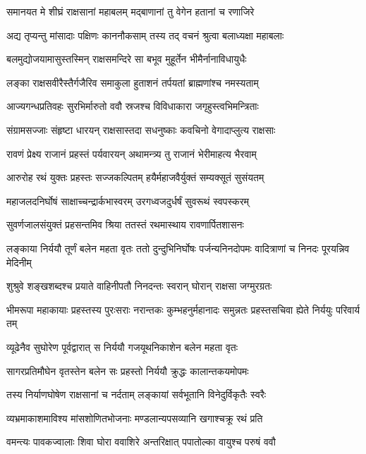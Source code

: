 \twolineshloka
{समानयत मे शीघ्रं राक्षसानां महाबलम्}
{मद्बाणानां तु वेगेन हतानां च रणाजिरे} %

\twolineshloka
{अद्य तृप्यन्तु मांसादाः पक्षिणः काननौकसाम्}
{तस्य तद् वचनं श्रुत्वा बलाध्यक्षा महाबलाः} %

\twolineshloka
{बलमुद्योजयामासुस्तस्मिन् राक्षसमन्दिरे}
{सा बभूव मुहूर्तेन भीमैर्नानाविधायुधैः} %

\twolineshloka
{लङ्का राक्षसवीरैस्तैर्गजैरिव समाकुला}
{हुताशनं तर्पयतां ब्राह्मणांश्च नमस्यताम्} %

\twolineshloka
{आज्यगन्धप्रतिवहः सुरभिर्मारुतो ववौ}
{स्रजश्च विविधाकारा जगृहुस्त्वभिमन्त्रिताः} %

\twolineshloka
{संग्रामसज्जाः संहृष्टा धारयन् राक्षसास्तदा}
{सधनुष्काः कवचिनो वेगादाप्लुत्य राक्षसाः} %

\twolineshloka
{रावणं प्रेक्ष्य राजानं प्रहस्तं पर्यवारयन्}
{अथामन्त्र्य तु राजानं भेरीमाहत्य भैरवाम्} %

\twolineshloka
{आरुरोह रथं युक्तः प्रहस्तः सज्जकल्पितम्}
{हयैर्महाजवैर्युक्तं सम्यक्सूतं सुसंयतम्} %

\twolineshloka
{महाजलदनिर्घोषं साक्षाच्चन्द्रार्कभास्वरम्}
{उरगध्वजदुर्धर्षं सुवरूथं स्वपस्करम्} %

\twolineshloka
{सुवर्णजालसंयुक्तं प्रहसन्तमिव श्रिया}
{ततस्तं रथमास्थाय रावणार्पितशासनः} %

\threelineshloka
{लङ्काया निर्ययौ तूर्णं बलेन महता वृतः}
{ततो दुन्दुभिनिर्घोषः पर्जन्यनिनदोपमः}
{वादित्राणां च निनदः पूरयन्निव मेदिनीम्} %

\twolineshloka
{शुश्रुवे शङ्खशब्दश्च प्रयाते वाहिनीपतौ}
{निनदन्तः स्वरान् घोरान् राक्षसा जग्मुरग्रतः} %

\threelineshloka
{भीमरूपा महाकायाः प्रहस्तस्य पुरःसराः}
{नरान्तकः कुम्भहनुर्महानादः समुन्नतः}
{प्रहस्तसचिवा ह्येते निर्ययुः परिवार्य तम्} %

\twolineshloka
{व्यूढेनैव सुघोरेण पूर्वद्वारात् स निर्ययौ}
{गजयूथनिकाशेन बलेन महता वृतः} %

\twolineshloka
{सागरप्रतिमौघेन वृतस्तेन बलेन सः}
{प्रहस्तो निर्ययौ क्रुद्धः कालान्तकयमोपमः} %

\twolineshloka
{तस्य निर्याणघोषेण राक्षसानां च नर्दताम्}
{लङ्कायां सर्वभूतानि विनेदुर्विकृतैः स्वरैः} %

\twolineshloka
{व्यभ्रमाकाशमाविश्य मांसशोणितभोजनाः}
{मण्डलान्यपसव्यानि खगाश्चक्रू रथं प्रति} %

\twolineshloka
{वमन्त्यः पावकज्वालाः शिवा घोरा ववाशिरे}
{अन्तरिक्षात् पपातोल्का वायुश्च परुषं ववौ} %

